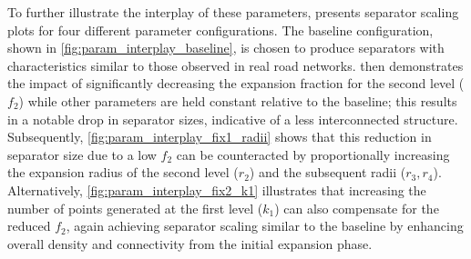 To further illustrate the interplay of these parameters,  presents separator scaling plots for four different parameter configurations.
The baseline configuration, shown in \cref{fig:param_interplay_baseline}, is chosen to produce separators with characteristics similar to those observed in real road networks.
 then demonstrates the impact of significantly decreasing the expansion fraction for the second level (\(f_2\)) while other parameters are held constant relative to the baseline; this results in a notable drop in separator sizes, indicative of a less interconnected structure.
Subsequently, \cref{fig:param_interplay_fix1_radii} shows that this reduction in separator size due to a low \(f_2\) can be counteracted by proportionally increasing the expansion radius of the second level (\(r_2\)) and the subsequent radii (\(r_3, r_4\)).
Alternatively, \cref{fig:param_interplay_fix2_k1} illustrates that increasing the number of points generated at the first level (\(k_1\)) can also compensate for the reduced \(f_2\), again achieving separator scaling similar to the baseline by enhancing overall density and connectivity from the initial expansion phase.

